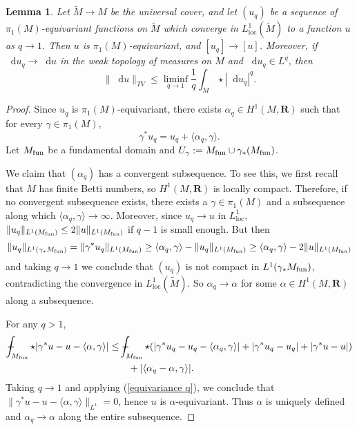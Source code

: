 \documentclass[reqno,11pt]{amsart}
\newcommand{\RR}{\mathbf{R}}
\newcommand*\dif{\mathop{}\!\mathrm{d}}
\newcommand{\loc}{\mathrm{loc}}
\newtheorem{lemma}[theorem]{Lemma}
\theoremstyle{definition}
\numberwithin{equation}{section}
\def\Xint#1{\mathchoice
{\XXint\displaystyle\textstyle{#1}}%
{\XXint\textstyle\scriptstyle{#1}}%
{\XXint\scriptstyle\scriptscriptstyle{#1}}%
{\XXint\scriptscriptstyle\scriptscriptstyle{#1}}%
\!\int}
\def\XXint#1#2#3{{\setbox0=\hbox{$#1{#2#3}{\int}$ }
\vcenter{\hbox{$#2#3$ }}\kern-.6\wd0}}
\def\dashint{\Xint-}
\begin{document}
\begin{lemma}\label{L1 convergence preserves pi1}
Let $\tilde M \to M$ be the universal cover, and let $(u_q)$ be a sequence of $\pi_1(M)$-equivariant functions on $\tilde M$ which converge in $L^1_\loc(\tilde M)$ to a function $u$ as $q \to 1$.
Then $u$ is $\pi_1(M)$-equivariant, and $[u_q] \to [u]$.
Moreover, if $\dif u_q \to \dif u$ in the weak topology of measures on $M$ and $\dif u_q \in L^q$, then
\begin{equation}\label{q to 1 Holder}
\|\dif u\|_{TV} \leq \liminf_{q \to 1} \frac{1}{q} \int_M \star |\dif u_q|^q.
\end{equation}
\end{lemma}
\begin{proof}
Since $u_q$ is $\pi_1(M)$-equivariant, there exists $\alpha_q \in H^1(M, \RR)$ such that for every $\gamma \in \pi_1(M)$,
\begin{equation}\label{equivariance q}
	\gamma^* u_q = u_q + \langle \alpha_q, \gamma\rangle.
\end{equation}
Let $M_{\rm fun}$ be a fundamental domain and $U_\gamma := M_{\rm fun} \cup \gamma_* (M_{\rm fun})$.

We claim that $(\alpha_q)$ has a convergent subsequence.
To see this, we first recall that $M$ has finite Betti numbers, so $H^1(M, \RR)$ is locally compact.
Therefore, if no convergent subsequence exists, there exists a $\gamma \in \pi_1(M)$ and a subsequence along which $\langle \alpha_q, \gamma\rangle \to \infty$.
Moreover, since $u_q \to u$ in $L^1_\loc$, $\|u_q\|_{L^1(M_{\rm fun})} \leq 2\|u\|_{L^1(M_{\rm fun})}$ if $q - 1$ is small enough.
But then 
$$\|u_q\|_{L^1(\gamma_* M_{\rm fun})} = \|\gamma^* u_q\|_{L^1(M_{\rm fun})} \geq \langle \alpha_q, \gamma\rangle - \|u_q\|_{L^1(M_{\rm fun})} \geq \langle \alpha_q, \gamma\rangle - 2\|u\|_{L^1(M_{\rm fun})}$$
and taking $q \to 1$ we conclude that $(u_q)$ is not compact in $L^1(\gamma_* M_{\rm fun})$, contradicting the convergence in $L^1_\loc(\tilde M)$.
So $\alpha_q \to \alpha$ for some $\alpha \in H^1(M, \RR)$ along a subsequence.

For any $q > 1$,
\begin{align*}
\dashint_{M_{\rm fun}} \star |\gamma^* u - u - \langle \alpha, \gamma\rangle| 
&\leq \dashint_{M_{\rm fun}} \star (|\gamma^* u_q - u_q - \langle \alpha_q, \gamma\rangle| + |\gamma^* u_q - u_q| + |\gamma^* u - u|) \\
&\qquad + |\langle \alpha_q - \alpha, \gamma\rangle|.
\end{align*}
Taking $q \to 1$ and applying (\ref{equivariance q}), we conclude that $\|\gamma^* u - u - \langle \alpha, \gamma\rangle\|_{L^1} = 0$, hence $u$ is $\alpha$-equivariant.
Thus $\alpha$ is uniquely defined and $\alpha_q \to \alpha$ along the entire subsequence.


\end{proof}
\end{document}

